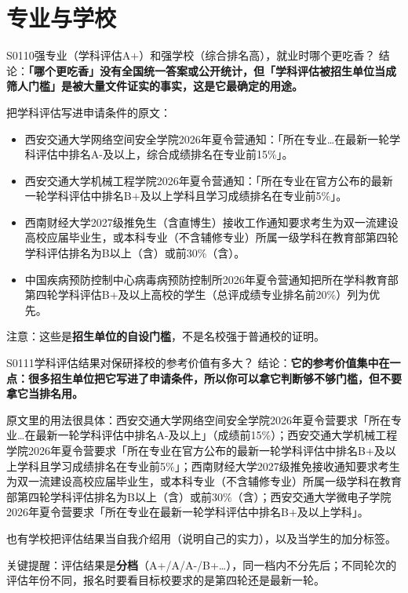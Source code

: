 \section{专业与学校}
\begin{qa}{S0110}{强专业（学科评估A+）和强学校（综合排名高），就业时哪个更吃香？}
结论：\textbf{「哪个更吃香」没有全国统一答案或公开统计，但「学科评估被招生单位当成筛人门槛」是被大量文件证实的事实，这是它最确定的用途。}

把学科评估写进申请条件的原文：
\begin{itemize}
  \item 西安交通大学网络空间安全学院2026年夏令营通知：「所在专业…在最新一轮学科评估中排名A-及以上，综合成绩排名在专业前15\%」。
  \item 西安交通大学机械工程学院2026年夏令营通知：「所在专业在官方公布的最新一轮学科评估中排名B+及以上学科且学习成绩排名在专业前5\%」。
  \item 西南财经大学2027级推免生（含直博生）接收工作通知要求考生为双一流建设高校应届毕业生，或本科专业（不含辅修专业）所属一级学科在教育部第四轮学科评估排名为B以上（含）或前30\%（含）。
  \item 中国疾病预防控制中心病毒病预防控制所2026年夏令营通知把所在学科教育部第四轮学科评估B+及以上高校的学生（总评成绩专业排名前20\%）列为优先。
\end{itemize}

注意：这些是\textbf{招生单位的自设门槛}，不是名校强于普通校的证明。
\end{qa}

\begin{qa}{S0111}{学科评估结果对保研择校的参考价值有多大？}
结论：\textbf{它的参考价值集中在一点：很多招生单位把它写进了申请条件，所以你可以拿它判断够不够门槛，但不要拿它当排名用。}

原文里的用法很具体：西安交通大学网络空间安全学院2026年夏令营要求「所在专业…在最新一轮学科评估中排名A-及以上」（成绩前15\%）；西安交通大学机械工程学院2026年夏令营要求「所在专业在官方公布的最新一轮学科评估中排名B+及以上学科且学习成绩排名在专业前5\%」；西南财经大学2027级推免接收通知要求考生为双一流建设高校应届毕业生，或本科专业（不含辅修专业）所属一级学科在教育部第四轮学科评估排名为B以上（含）或前30\%（含）；西安交通大学微电子学院2026年夏令营要求「所在专业在最新一轮学科评估中排名B+及以上学科」。

也有学校把评估结果当自我介绍用（说明自己的实力），以及当学生的加分标签。

关键提醒：评估结果是\textbf{分档}（A+/A/A-/B+…），同一档内不分先后；不同轮次的评估年份不同，报名时要看目标校要求的是第四轮还是最新一轮。
\end{qa}

